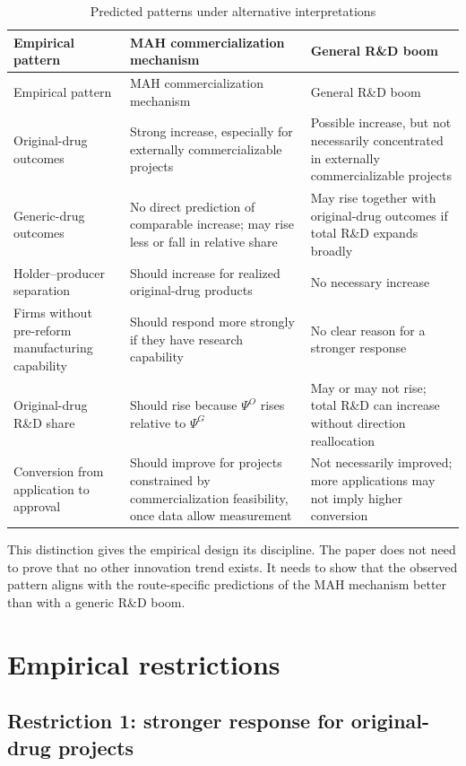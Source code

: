 \documentclass[12pt]{article}
\begin{document}
\begin{longtable}{p{}p{}p{}}
\caption{Predicted patterns under alternative interpretations}\label{tab:rdboom}\\
\toprule
Empirical pattern & MAH commercialization mechanism & General R\&D boom \\
\midrule
\endfirsthead
\toprule
Empirical pattern & MAH commercialization mechanism & General R\&D boom \\
\midrule
\endhead
Original-drug outcomes & Strong increase, especially for externally commercializable projects & Possible increase, but not necessarily concentrated in externally commercializable projects \\
\addlinespace
Generic-drug outcomes & No direct prediction of comparable increase; may rise less or fall in relative share & May rise together with original-drug outcomes if total R\&D expands broadly \\
\addlinespace
Holder--producer separation & Should increase for realized original-drug products & No necessary increase \\
\addlinespace
Firms without pre-reform manufacturing capability & Should respond more strongly if they have research capability & No clear reason for a stronger response \\
\addlinespace
Original-drug R\&D share & Should rise because $\Psi^O$ rises relative to $\Psi^G$ & May or may not rise; total R\&D can increase without direction reallocation \\
\addlinespace
Conversion from application to approval & Should improve for projects constrained by commercialization feasibility, once data allow measurement & Not necessarily improved; more applications may not imply higher conversion \\
\bottomrule
\end{longtable}

This distinction gives the empirical design its discipline. The paper does not need to prove that no other innovation trend exists. It needs to show that the observed pattern aligns with the route-specific predictions of the MAH mechanism better than with a generic R\&D boom.

\section{Empirical restrictions}

\subsection{Restriction 1: stronger response for original-drug projects}
\end{document}
